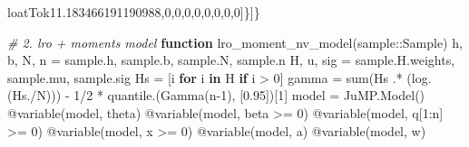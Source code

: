 \documentclass[
  10pt,
  a4paper,
,tablecaptionabove
]{scrartcl}
\newenvironment{Shaded}{}{}
\newcommand{\CommentTok}[1]{\textcolor[rgb]{0.38,0.63,0.69}{\textit{#1}}}
\newcommand{\DecValTok}[1]{\textcolor[rgb]{0.25,0.63,0.44}{#1}}
\newcommand{\FloatTok}[1]{\textcolor[rgb]{0.25,0.63,0.44}{#1}}
\newcommand{\FunctionTok}[1]{\textcolor[rgb]{0.02,0.16,0.49}{#1}}
\newcommand{\KeywordTok}[1]{\textcolor[rgb]{0.00,0.44,0.13}{\textbf{#1}}}
\newcommand{\NormalTok}[1]{#1}
\newcommand{\OperatorTok}[1]{\textcolor[rgb]{0.40,0.40,0.40}{#1}}
\newcommand{\OtherTok}[1]{\textcolor[rgb]{0.00,0.44,0.13}{#1}}
\newcommand{\PreprocessorTok}[1]{\textcolor[rgb]{0.74,0.48,0.00}{#1}}
\begin{document}
\begin{Shaded}
\begin{Highlighting}[]
loatTok{11.183466191190988}\OtherTok{,}\DecValTok{0}\OtherTok{,}\DecValTok{0}\OtherTok{,}\DecValTok{0}\OtherTok{,}\DecValTok{0}\OtherTok{,}\DecValTok{0}\OtherTok{,}\DecValTok{0}\OtherTok{,}\DecValTok{0}\OtherTok{,}\DecValTok{0}\OtherTok{]}\FunctionTok{\}}\OtherTok{]}\FunctionTok{\}}
\end{Highlighting}
\end{Shaded}

\begin{Shaded}
\begin{Highlighting}[]
\CommentTok{\# 2. lro + moments model}
\KeywordTok{function}\NormalTok{ lro\_moment\_nv\_model(sample}\OperatorTok{::}\NormalTok{Sample)}
\NormalTok{    h}\OperatorTok{,}\NormalTok{ b}\OperatorTok{,}\NormalTok{ N}\OperatorTok{,}\NormalTok{ n }\OperatorTok{=}\NormalTok{ sample.h}\OperatorTok{,}\NormalTok{ sample.b}\OperatorTok{,}\NormalTok{ sample.N}\OperatorTok{,}\NormalTok{ sample.n}
\NormalTok{    H}\OperatorTok{,}\NormalTok{ u}\OperatorTok{,}\NormalTok{ sig }\OperatorTok{=}\NormalTok{ sample.H.weights}\OperatorTok{,}\NormalTok{ sample.mu}\OperatorTok{,}\NormalTok{ sample.sig }
\NormalTok{    Hs }\OperatorTok{=}\NormalTok{ [i }\KeywordTok{for}\NormalTok{ i }\KeywordTok{in}\NormalTok{ H }\KeywordTok{if}\NormalTok{ i }\OperatorTok{\textgreater{}} \FloatTok{0}\NormalTok{]}
\NormalTok{    gamma }\OperatorTok{=}\NormalTok{ sum(Hs }\OperatorTok{.*}\NormalTok{ (log.(Hs}\OperatorTok{./}\NormalTok{N))) }\OperatorTok{{-}} \FloatTok{1}\OperatorTok{/}\FloatTok{2} \OperatorTok{*}\NormalTok{ quantile.(Gamma(n}\OperatorTok{{-}}\FloatTok{1}\NormalTok{)}\OperatorTok{,}\NormalTok{ [}\FloatTok{0.95}\NormalTok{])[}\FloatTok{1}\NormalTok{]}
\NormalTok{    model }\OperatorTok{=}\NormalTok{ JuMP.Model()}
    \PreprocessorTok{@variable}\NormalTok{(model}\OperatorTok{,}\NormalTok{ theta)}
    \PreprocessorTok{@variable}\NormalTok{(model}\OperatorTok{,}\NormalTok{ beta }\OperatorTok{\textgreater{}=} \FloatTok{0}\NormalTok{)}
    \PreprocessorTok{@variable}\NormalTok{(model}\OperatorTok{,}\NormalTok{ q[}\FloatTok{1}\OperatorTok{:}\NormalTok{n] }\OperatorTok{\textgreater{}=} \FloatTok{0}\NormalTok{)}
    \PreprocessorTok{@variable}\NormalTok{(model}\OperatorTok{,}\NormalTok{ x }\OperatorTok{\textgreater{}=} \FloatTok{0}\NormalTok{)}
    \PreprocessorTok{@variable}\NormalTok{(model}\OperatorTok{,}\NormalTok{ a)}
    \PreprocessorTok{@variable}\NormalTok{(model}\OperatorTok{,}\NormalTok{ w)}


\end{Highlighting}
\end{Shaded}
\end{document}
